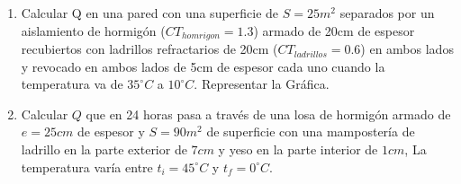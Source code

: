 \documentclass[../main]{subfiles}
\begin{document}
\begin{enumerate}
{      \begin{equation}
        Q=\dfrac{ \Delta t}{\dfrac{e}{S\cdot Ct}}
      \end{equation}
      \begin{equation}
        R_t=R_1+R_2+\cdots+R_n=\dfrac{e_1}{S_1\cdot
        Ct_1}+\dfrac{e_2}{S_2\cdot Ct_2}+\cdots+\dfrac{e_n}{S_n\cdot Ct_n}
      \end{equation}
      \begin{equation}
        Q=\dfrac{ \Delta t}{\dfrac{e_1}{S_1\cdot
        Ct_1}+\dfrac{e_2}{S_2\cdot Ct_2}+\cdots+\dfrac{e_n}{S_n\cdot Ct_n}}
      \end{equation}
    }
  \item Calcular Q en una pared con una superficie de $S=25m^2$
    separados por un aislamiento de hormigón ($CT_{homrigon}=1.3$)
    armado de 20cm de espesor recubiertos con ladrillos refractarios
    de 20cm ($CT_{ladrillos}=0.6$) en ambos lados y revocado en ambos
    lados de 5cm de espesor cada uno cuando la temperatura va de
    $35^\circ C$ a $10^\circ C$. Representar la Gráfica.
  \item Calcular $Q$ que en 24 horas pasa a través de una losa de
    hormigón armado de $e=25cm$ de espesor y $S=90m^2$ de superficie
    con una mampostería de ladrillo en la parte exterior de $7cm$ y
    yeso en la parte interior de $1cm$, La temperatura varía entre
    $t_i=45^\circ C$ y $t_f=0 ^\circ C$.
\end{enumerate}
\end{document}
